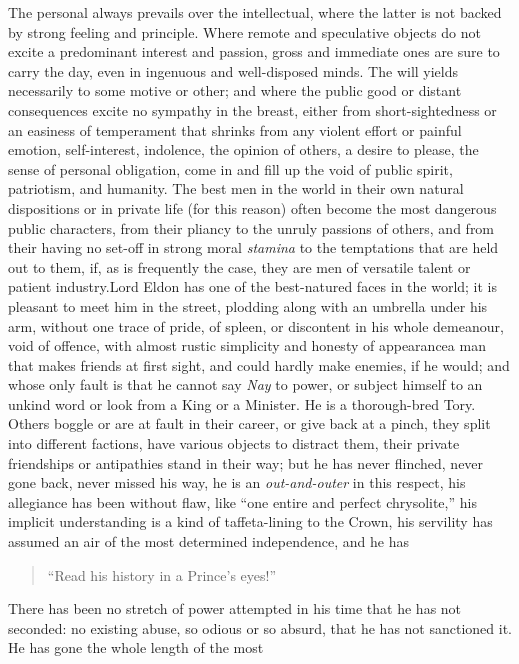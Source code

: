 The personal always prevails over the intellectual, where the
latter is not backed by strong feeling and principle. Where remote
and speculative objects do not excite a predominant interest and
passion, gross and immediate ones are sure to carry the day, even
in ingenuous and well-disposed minds. The will yields necessarily
to some motive or other; and where the public good or distant
consequences excite no sympathy in the breast, either from
short-sightedness or an easiness of temperament that shrinks from
any violent effort or painful emotion, self-interest, indolence,
the opinion of others, a desire to please, the sense of personal
obligation, come in and fill up the void of public spirit,
patriotism, and humanity. The best men in the world in their own
natural dispositions or in private life (for this reason) often
become the most dangerous public characters, from their pliancy to
the unruly passions of others, and from their having no set-off in
strong moral \emph{stamina} to the temptations that are held out
to them, if, as is frequently the case, they are men of versatile
talent or patient industry.\textemdash Lord Eldon has one of the
best-natured faces in the world; it is pleasant to meet him in the
street, plodding along with an umbrella under his arm, without one
trace of pride, of spleen, or discontent in his whole demeanour,
void of offence, with almost rustic simplicity and honesty of
appearance\textemdash a man that makes friends at first sight, and
could hardly make enemies, if he would; and whose only fault is
that he cannot say \emph{Nay} to power, or subject himself to an
unkind word or look from a King or a Minister. He is a
thorough-bred Tory.  Others boggle or are at fault in their
career, or give back at a pinch, they split into different
factions, have various objects to distract them, their private
friendships or antipathies stand in their way; but he has never
flinched, never gone back, never missed his way, he is an
\emph{out-and-outer} in this respect, his allegiance has been
without flaw, like ``one entire and perfect chrysolite,'' his
implicit understanding is a kind of taffeta-lining to the Crown,
his servility has assumed an air of the most determined
independence, and he has
\begin{quote}
  ``Read his history in a Prince's eyes!''\textemdash

\end{quote}
There has been no stretch of power attempted in his time that he
has not seconded: no existing abuse, so odious or so absurd, that
he has not sanctioned it. He has gone the whole length of the most
